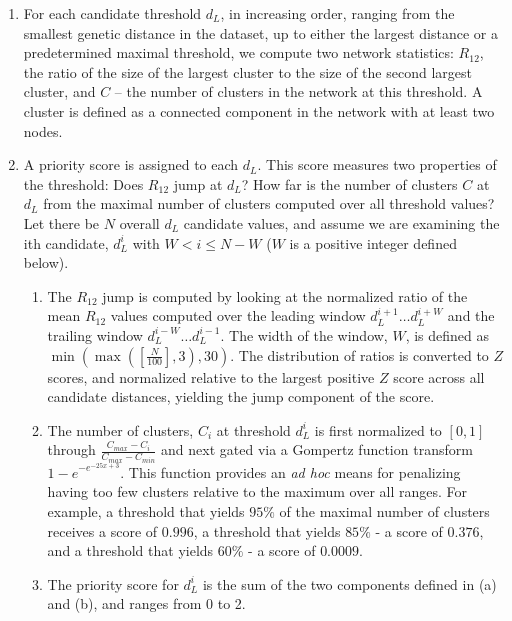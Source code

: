 \documentclass[utf8]{FrontiersinHarvard} %
\begin{document}
\begin{enumerate}
	\item{For each candidate threshold $d_L$, in increasing order, ranging from the smallest genetic distance in the dataset, up to either the largest distance or a predetermined maximal threshold, we compute two network statistics: $R_{12}$, the ratio of the size of the largest cluster to the size of the second largest cluster, and $C$ – the number of clusters in the network at this threshold. A cluster is defined as a connected component in the network with at least two nodes.}

	\item{ A priority score is assigned to each $d_L$. This score measures two properties of the threshold: Does $R_{12}$ jump at $d_L$? How far is the number of clusters $C$ at $d_L$ from the maximal number of clusters computed over all threshold values? Let there be $N$ overall $d_L$ candidate values, and assume we are examining the ith candidate, $d_L^i$ with $W < i \leq N - W$ ($W$ is a positive integer defined below).

	            \begin{enumerate}
		            \item{The $R_{12}$ jump is computed by looking at the normalized ratio of the mean $R_{12}$ values computed over the leading window $d_L^{i+1}…d_L^{i+W}$ and the trailing window $d_L^{i-W}… d_L^{i-1}$. The width of the window, $W$, is defined as $\min \left( \max \left(\left[\frac{N}{100}\right], 3\right), 30 \right)$. The distribution of ratios is converted to $Z$ scores, and normalized relative to the largest positive $Z$ score across all candidate distances, yielding the jump component of the score.}
		            \item{The number of clusters, $C_i$ at threshold $d_L^i$ is first normalized to $[0,1]$ through $\frac{{C_{max} - C_i}}{{C_{max} -C_{min}}}$ and next gated via a Gompertz function transform ${1-e}^{-e^{-25x+3}}$. This function provides an \emph{ad hoc} means for penalizing having too few clusters relative to the maximum over all ranges. For example, a threshold that yields $95\%$ of the maximal number of clusters receives a score of $0.996$,  a threshold that yields $85\%$ - a score of $0.376$, and a threshold that yields $60\%$ - a score of $0.0009$.}
		            \item{The priority score for $d_L^i$ is the sum of the two components defined in (a) and (b), and ranges from 0 to 2.}
	            \end{enumerate}}


\end{enumerate}
\end{document}
